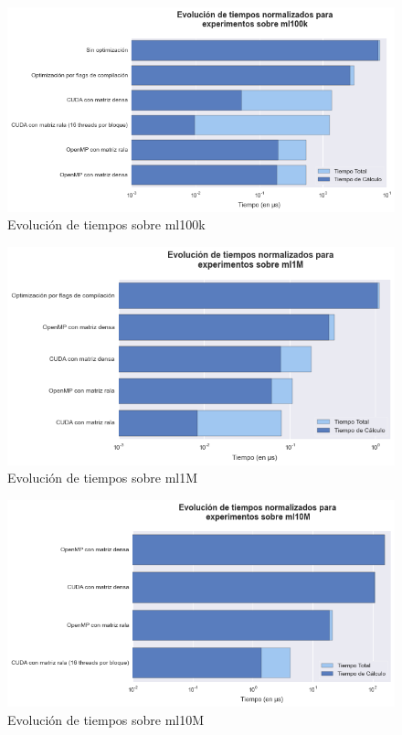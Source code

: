 \documentclass[11pt, a4paper]{article}
\begin{document}
  \begin{figure}[ht]
      \centering
      \includegraphics[width=\textwidth]{plots/ml100k.png}
      \caption{Evolución de tiempos sobre ml100k}\label{fig:ml100k}
  \end{figure}
 
  \begin{figure}[ht]
      \centering
      \includegraphics[width=\textwidth]{plots/ml1M.png}
      \caption{Evolución de tiempos sobre ml1M}\label{fig:ml1M}
  \end{figure}
 
  \begin{figure}[ht]
      \centering
      \includegraphics[width=\textwidth]{plots/ml10M.png}
      \caption{Evolución de tiempos sobre ml10M}\label{fig:ml10M}
  \end{figure}
 
\end{document}
